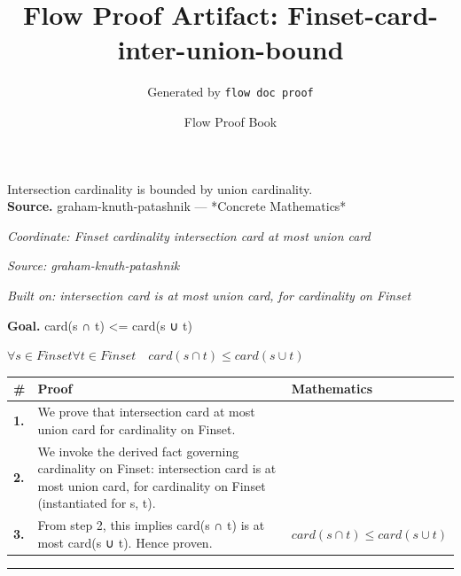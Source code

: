\documentclass[11pt]{article}
\title{Flow Proof Artifact: Finset-card-inter-union-bound}
\author{Generated by \texttt{flow doc proof}}
\date{Flow Proof Book}
\theoremstyle{definition}
\begin{document}
\maketitle
Intersection cardinality is bounded by union cardinality.\\[0.5em]
\textbf{Source.} graham-knuth-patashnik — *Concrete Mathematics*\\[0.5em]
\bigskip
{}\par
\smallskip\noindent\textit{Coordinate: Finset \cdot cardinality \cdot intersection card at most union card}\par
\smallskip\noindent\textit{Source: graham-knuth-patashnik}\par
\smallskip\noindent\textit{Built on: intersection card is at most union card, for cardinality on Finset}\par
\medskip
\noindent\textbf{Goal.} card(s ∩ t) <= card(s ∪ t)\par
\noindent$\displaystyle \forall s \in Finset \forall t \in Finset\quad card(s ∩ t) \le card(s ∪ t)$\par
\medskip
\noindent
\begin{tabular}{@{} >{\raggedright\arraybackslash}p{} >{\raggedright\arraybackslash}p{} >{\raggedleft\arraybackslash}p{} @{}}
\textbf{\#} & \textbf{Proof} & \textbf{Mathematics} \\
\midrule
\textbf{1.} & We prove that intersection card at most union card for cardinality on Finset. & \\[0.45em]
\textbf{2.} & We invoke the derived fact governing cardinality on Finset: intersection card is at most union card, for cardinality on Finset (instantiated for s, t). & \\[0.45em]
\textbf{3.} & From step 2, this implies card(s ∩ t) is at most card(s ∪ t). Hence proven. & $\displaystyle card(s ∩ t) \le card(s ∪ t)$ \\[0.45em]
\bottomrule
\end{tabular}
\label{thm:Finset-cardinality-intersection_card_at_most_union_card}
\par\medskip\hrule
\end{document}
